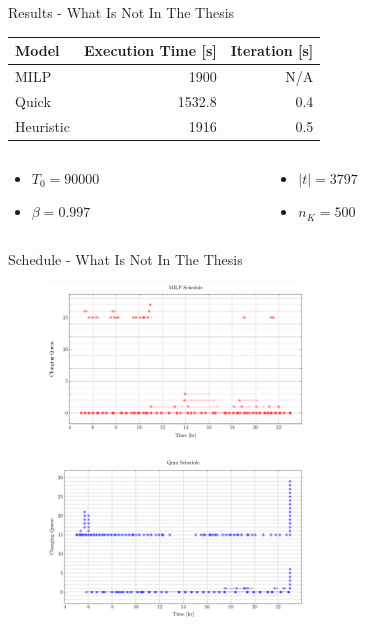 \documentclass[bigger]{beamer}
\begin{document}
\begin{frame}[label={sec:org5c6b620}]{Results - What Is Not In The Thesis}
\begin{center}
\begin{tabular}{lrr}
\alert{Model} & \alert{Execution Time} [s] & \alert{Iteration} [s]\\[0pt]
\hline
MILP & 1900 & N/A\\[0pt]
Quick & 1532.8 & 0.4\\[0pt]
Heuristic & 1916 & 0.5\\[0pt]
\end{tabular}
\end{center}

\begin{columns}
\begin{column}{0.5\columnwidth}
\begin{itemize}
\item \(T_0 = 90000\)
\item \(\beta = 0.997\)
\end{itemize}
\end{column}
\begin{column}{0.5\columnwidth}
\begin{itemize}
\item \(|t| = 3797\)
\item \(n_K = 500\)
\end{itemize}
\end{column}
\end{columns}
\end{frame}

\begin{frame}[label={sec:orgb711d57}]{Schedule - What Is Not In The Thesis}
\begin{figure}[htpb]
\centering
    \includegraphics[width=0.6\textwidth]{img/sa-pap-paper-good/schedule-milp}
\end{figure}
\begin{figure}[htpb]
\centering
    \includegraphics[width=0.6\textwidth]{img/sa-pap-paper-good/schedule-quinn}
\end{figure}
\end{frame}
\end{document}
